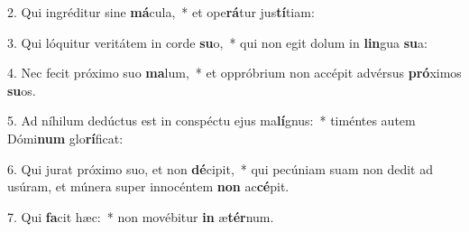2. Qui ingréditur sine \textbf{má}cula,~*  et ope\textbf{rá}tur jus\textbf{tí}tiam:\

3. Qui lóquitur veritátem in corde \textbf{su}o,~*  qui non egit dolum in \textbf{lin}gua \textbf{su}a:\

4. Nec fecit próximo suo \textbf{ma}lum,~*  et oppróbrium non accépit advérsus \textbf{pró}ximos \textbf{su}os.\

5. Ad níhilum dedúctus est in conspéctu ejus ma\textbf{lí}gnus:~*  timéntes autem Dómi\textbf{num} glo\textbf{rí}ficat:\

6. Qui jurat próximo suo, et non \textbf{dé}cipit,~*  qui pecúniam suam non dedit ad usúram, et múnera super innocéntem \textbf{non} ac\textbf{cé}pit.\

7. Qui \textbf{fa}cit hæc:~*  non movébitur \textbf{in} æ\textbf{tér}num.\

